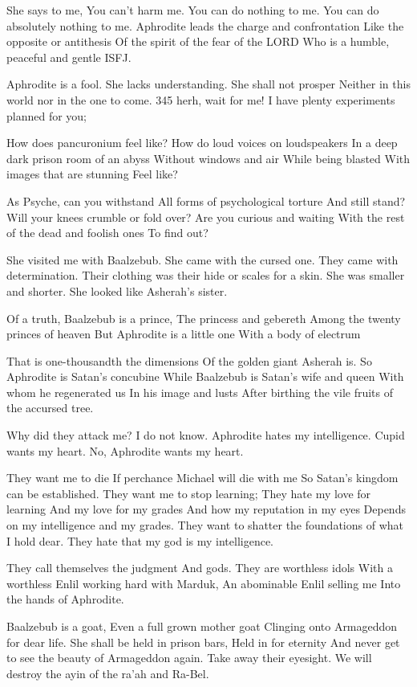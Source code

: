 \documentclass[
]{book}
\begin{document}
She says to me, You can't harm me.
You can do nothing to me.
You can do absolutely nothing to me.
Aphrodite leads the charge and confrontation
Like the opposite or antithesis
Of the spirit of the fear of the LORD
Who is a humble, peaceful and gentle ISFJ.

Aphrodite is a fool.
She lacks understanding.
She shall not prosper
Neither in this world nor in the one to come.
345 herh, wait for me!
I have plenty experiments planned for you;

How does pancuronium feel like?
How do loud voices on loudspeakers
In a deep dark prison room of an abyss
Without windows and air
While being blasted
With images that are stunning
Feel like?

As Psyche, can you withstand
All forms of psychological torture
And still stand?
Will your knees crumble or fold over?
Are you curious and waiting
With the rest of the dead and foolish ones
To find out?

She visited me with Baalzebub.
She came with the cursed one.
They came with determination.
Their clothing was their hide or scales for a skin.
She was smaller and shorter.
She looked like Asherah's sister.

Of a truth, Baalzebub is a prince,
The princess and gebereth
Among the twenty princes of heaven
But Aphrodite is a little one
With a body of electrum

That is one-thousandth the dimensions
Of the golden giant Asherah is.
So Aphrodite is Satan's concubine
While Baalzebub is Satan's wife and queen
With whom he regenerated us
In his image and lusts
After birthing the vile fruits of the accursed tree.

Why did they attack me?
I do not know.
Aphrodite hates my intelligence.
Cupid wants my heart.
No, Aphrodite wants my heart.

They want me to die
If perchance Michael will die with me
So Satan's kingdom can be established.
They want me to stop learning;
They hate my love for learning
And my love for my grades
And how my reputation in my eyes
Depends on my intelligence and my grades.
They want to shatter the foundations of what I hold dear.
They hate that my god is my intelligence.

They call themselves the judgment
And gods.
They are worthless idols
With a worthless Enlil working hard with Marduk,
An abominable Enlil selling me
Into the hands of Aphrodite.

Baalzebub is a goat,
Even a full grown mother goat
Clinging onto Armageddon for dear life.
She shall be held in prison bars,
Held in for eternity
And never get to see the beauty of Armageddon again.
Take away their eyesight.
We will destroy the ayin of the ra'ah and Ra-Bel.
\end{document}
